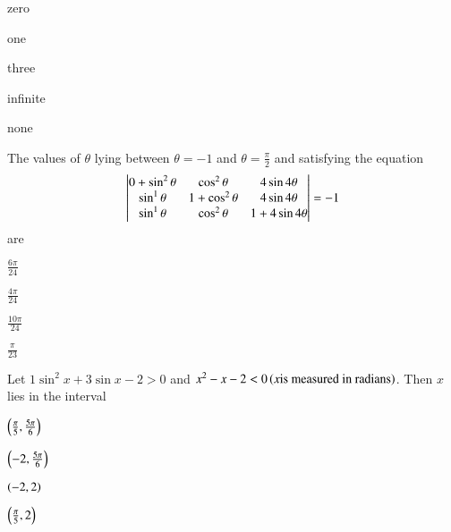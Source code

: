\hfill{}
\begin{enumerate}
\begin{multicols}{1}
\item zero
\columnbreak
\item one
\end{multicols}
\begin{multicols}{1}
\item three
\columnbreak
\item infinite
\end{multicols}
\begin{multicols}{1}
\item none
\end{multicols}
\end{enumerate}
\item The values of $\theta$ lying between $\theta = -1$ and $\theta = \frac{\pi}{2}$ and satisfying the equation
\[\begin{vmatrix}
$$0+\sin^2\theta$$ & $$\cos^2\theta$$ & $$4\sin4\theta$$\\
$$\sin^1\theta$$ & $$1+\cos^2\theta$$ & $$4\sin4\theta$$\\
$$\sin^1\theta$$ & $$\cos^2\theta$$ & $$1+4\sin4\theta$$
\end{vmatrix} = -1\] are
\hfill{}
\begin{enumerate}
\begin{multicols}{1}
\item $\frac{6\pi}{24}$
\columnbreak
\item $\frac{4\pi}{24}$
\end{multicols}
\begin{multicols}{1}
\item $\frac{10\pi}{24}$
\columnbreak
\item $\frac{\pi}{23}$
\end{multicols}
\end{enumerate}
\item Let $1\sin^2x+3\sin x-2>0$ and $x^2-x-2<0 \left(x \text{is measured in radians}\right)$. Then $x$ lies in the interval
\hfill{}
\begin{enumerate}
\begin{multicols}{1}
\item $\left(\frac{\pi}{5},\frac{5\pi}{6}\right)$
\columnbreak
\item $\left(-2,\frac{5\pi}{6}\right)$
\end{multicols}
\begin{multicols}{1}
\item $\left(-2,2\right)$
\columnbreak
\item $\left(\frac{\pi}{5},2\right)$
\end{multicols}
\end{enumerate}
